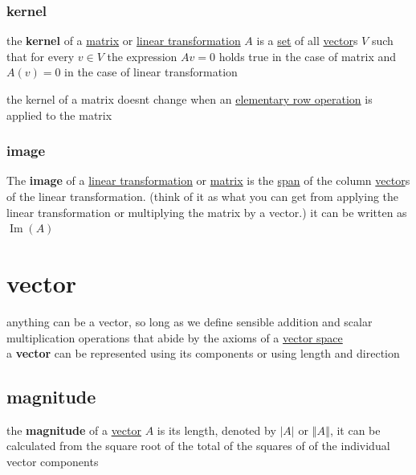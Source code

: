 \documentclass[a4paper,12pt]{article}
\DeclareMathOperator{\img}{Im}
\begin{document}
\subsubsection{kernel}
\label{sec:org975ee65}
\begin{definition}
the \textbf{kernel} of a \hyperref[sec:org2833a15]{matrix} or \hyperref[sec:orgdf3d063]{linear transformation} \(A\) is a \href{discrete_maths2.org}{set} of all \hyperref[sec:org103a65e]{vector}s \(V\) such that for every \(v \in V\) the expression \(Av = 0\) holds true in the case of matrix and \(A(v)=0\) in the case of linear transformation\\
\begin{characteristic}
the kernel of a matrix doesnt change when an \hyperref[sec:orgdd80885]{elementary row operation} is applied to the matrix\\
\end{characteristic}
\end{definition}
\subsubsection{image}
\label{sec:org149cad8}
\begin{definition}
The \textbf{image} of a \hyperref[sec:orgdf3d063]{linear transformation} or \hyperref[sec:org2833a15]{matrix} is the \hyperref[sec:org1ee137f]{span} of the column \hyperref[sec:org103a65e]{vector}s of the linear transformation. (think of it as what you can get from applying the linear transformation or multiplying the matrix by a vector.) it can be written as \(\img(A)\)\\
\end{definition}
\section{vector}
\label{sec:org103a65e}
anything can be a vector, so long as we define sensible addition and scalar multiplication operations that abide by the axioms of a \hyperref[sec:orgea93933]{vector space}\\
a \textbf{vector} can be represented using its components or using length and direction\\
\subsection{magnitude}
\label{sec:orgd47f5ea}
\begin{definition}
the \textbf{magnitude} of a \hyperref[sec:org103a65e]{vector} \(A\) is its length, denoted by \(|A|\) or \(\left\Vert A \right\Vert\), it can be calculated from the square root of the total of the squares of of the individual vector components\\
\end{definition}
\end{document}
